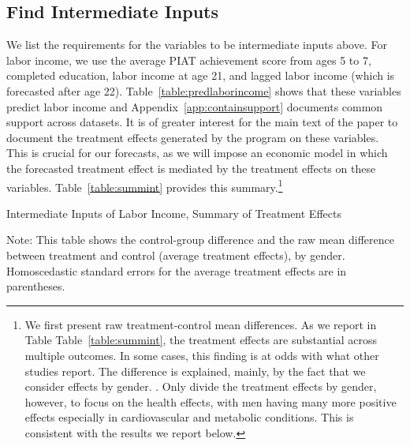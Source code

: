 \subsection{Find Intermediate Inputs}

\noindent We list the requirements for the variables to be intermediate inputs above. For labor income, we use the average PIAT achievement score from ages 5 to 7, completed education, labor income at age 21, and lagged labor income (which is forecasted after age 22). Table~\ref{table:predlaborincome} shows that these variables predict labor income and Appendix~\ref{app:containsupport} documents common support across datasets. It is of greater interest for the main text of the paper to document the treatment effects generated by the program on these variables. This is crucial for our forecasts, as we will impose an economic model in which the forecasted treatment effect is mediated by the treatment effects on these variables. Table~\ref{table:summint} provides this summary.\footnote{We first present raw treatment-control mean differences. As we report in Table Table~\ref{table:summint}, the treatment effects are substantial across multiple outcomes. In some cases, this finding is at odds with what other studies report. The difference is explained, mainly, by the fact that we consider effects by gender. \citet{Ramey_etal_1985_Project-CARE_TiECSE,Clarke_Campbell_1998_ABC_Comparison_ECRQ,Campbell_Pungello_etal_2001_DP,Campbell_Ramey_etal_2002_ADS,Campbell_Wasik_etal_2008_ECRQ,Campbell_Conti_etal_2014_EarlyChildhoodInvestments}. Only \citet{Campbell_Conti_etal_2014_EarlyChildhoodInvestments} divide the treatment effects by gender, however, to focus on the health effects, with men having many more positive effects especially in cardiovascular and metabolic conditions. This is consistent with the results we report below.}\\

\begin{table}[!htpb]
\begin{threeparttable}
\caption{Intermediate Inputs of Labor Income, Summary of Treatment Effects} \label{table:summint}
\centering

\begin{tablenotes}
\footnotesize
\item Note: This table shows the control-group difference and the raw mean difference between treatment and control (average treatment effects), by gender. Homoscedastic standard errors for the average treatment effects are in parentheses.
\end{tablenotes}
\end{threeparttable}
\end{table}

